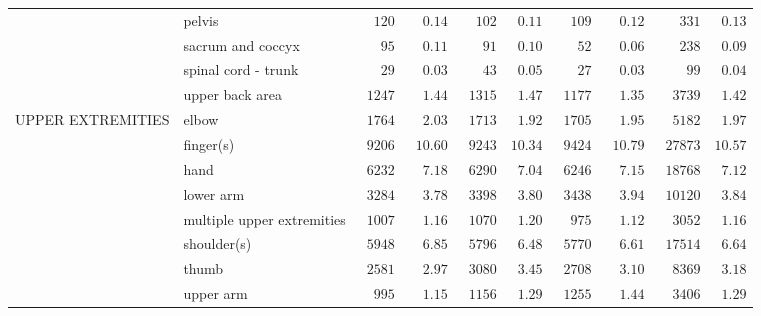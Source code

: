 \documentclass[9pt, oneside]{article}   	%
\begin{document}
\begin{longtable}{p{1.8in}p{2.2in}cccccccc}
 & pelvis  & $\phantom{00}120$ & $\phantom{00}0.14$ & $\phantom{00}102$ & $\phantom{0}0.11$ & $\phantom{00}109$ & $\phantom{00}0.12$ & $\phantom{000}331$ & $\phantom{0}0.13$ \\
 & sacrum and coccyx  & $\phantom{000}95$ & $\phantom{00}0.11$ & $\phantom{000}91$ & $\phantom{0}0.10$ & $\phantom{000}52$ & $\phantom{00}0.06$ & $\phantom{000}238$ & $\phantom{0}0.09$ \\
 & spinal cord - trunk  & $\phantom{000}29$ & $\phantom{00}0.03$ & $\phantom{000}43$ & $\phantom{0}0.05$ & $\phantom{000}27$ & $\phantom{00}0.03$ & $\phantom{0000}99$ & $\phantom{0}0.04$ \\
 & upper back area  & $\phantom{0}1247$ & $\phantom{00}1.44$ & $\phantom{0}1315$ & $\phantom{0}1.47$ & $\phantom{0}1177$ & $\phantom{00}1.35$ & $\phantom{00}3739$ & $\phantom{0}1.42$ \\
UPPER EXTREMITIES & elbow  & $\phantom{0}1764$ & $\phantom{00}2.03$ & $\phantom{0}1713$ & $\phantom{0}1.92$ & $\phantom{0}1705$ & $\phantom{00}1.95$ & $\phantom{00}5182$ & $\phantom{0}1.97$ \\
 & finger(s)  & $\phantom{0}9206$ & $\phantom{0}10.60$ & $\phantom{0}9243$ & $10.34$ & $\phantom{0}9424$ & $\phantom{0}10.79$ & $\phantom{0}27873$ & $10.57$ \\
 & hand  & $\phantom{0}6232$ & $\phantom{00}7.18$ & $\phantom{0}6290$ & $\phantom{0}7.04$ & $\phantom{0}6246$ & $\phantom{00}7.15$ & $\phantom{0}18768$ & $\phantom{0}7.12$ \\
 & lower arm  & $\phantom{0}3284$ & $\phantom{00}3.78$ & $\phantom{0}3398$ & $\phantom{0}3.80$ & $\phantom{0}3438$ & $\phantom{00}3.94$ & $\phantom{0}10120$ & $\phantom{0}3.84$ \\
 & multiple upper extremities  & $\phantom{0}1007$ & $\phantom{00}1.16$ & $\phantom{0}1070$ & $\phantom{0}1.20$ & $\phantom{00}975$ & $\phantom{00}1.12$ & $\phantom{00}3052$ & $\phantom{0}1.16$ \\
 & shoulder(s)  & $\phantom{0}5948$ & $\phantom{00}6.85$ & $\phantom{0}5796$ & $\phantom{0}6.48$ & $\phantom{0}5770$ & $\phantom{00}6.61$ & $\phantom{0}17514$ & $\phantom{0}6.64$ \\
 & thumb  & $\phantom{0}2581$ & $\phantom{00}2.97$ & $\phantom{0}3080$ & $\phantom{0}3.45$ & $\phantom{0}2708$ & $\phantom{00}3.10$ & $\phantom{00}8369$ & $\phantom{0}3.18$ \\
 & upper arm  & $\phantom{00}995$ & $\phantom{00}1.15$ & $\phantom{0}1156$ & $\phantom{0}1.29$ & $\phantom{0}1255$ & $\phantom{00}1.44$ & $\phantom{00}3406$ & $\phantom{0}1.29$ \\

\end{longtable}
\end{document}
